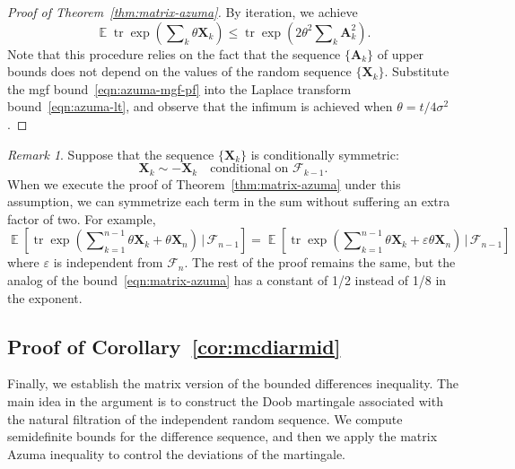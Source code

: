 \documentclass[11pt,letterpaper,twoside,reqno,draft]{amsart}
\theoremstyle{remark}
\newtheorem{rem}[thm]{Remark}
\numberwithin{equation}{section}
\numberwithin{thm}{section}
\begin{document}
\begin{proof}[Proof of Theorem~\ref{thm:matrix-azuma}]
By iteration, we achieve
\begin{equation} \label{eqn:azuma-mgf-pf}
{\operatorname{\mathbb{E}}} {\operatorname{tr}} \exp\left( \sum\nolimits_k \theta {\bm{{X}}}_k \right)
	\leq {\operatorname{tr}} \exp\left( 2\theta^2 \sum\nolimits_k {\bm{{A}}}_k^2 \right).
\end{equation}
Note that this procedure relies on the fact that the sequence $\{{\bm{{A}}}_k\}$ of upper bounds does not depend on the values of the random sequence $\{{\bm{{X}}}_k\}$.  Substitute the mgf bound~\eqref{eqn:azuma-mgf-pf} into the Laplace transform bound~\eqref{eqn:azuma-lt}, and observe that the infimum is achieved when $\theta = t/4\sigma^2$.
\end{proof}

\begin{rem} \label{rem:cond-sym}
Suppose that the sequence $\{{\bm{{X}}}_k\}$ is conditionally symmetric:
$$
{\bm{{X}}}_k \sim - {\bm{{X}}}_k
\quad\text{conditional on ${\mathscr{{F}}}_{k-1}$.}
$$
When we execute the proof of Theorem~\ref{thm:matrix-azuma} under this assumption, we can symmetrize each term in the sum without suffering an extra factor of two.  For example,
$$
{\operatorname{\mathbb{E}}}\left[ {\operatorname{tr}} \exp\left( \sum\nolimits_{k=1}^{n-1} \theta {\bm{{X}}}_k
	+ \theta {\bm{{X}}}_n \right) \, \big| \, {\mathscr{{F}}}_{n-1} \right]
	= {\operatorname{\mathbb{E}}}\left[ {\operatorname{tr}} \exp\left( \sum\nolimits_{k=1}^{n-1} \theta {\bm{{X}}}_k
	+ {\varepsilon} \theta {\bm{{X}}}_n \right) \, \big| \, {\mathscr{{F}}}_{n-1} \right]
$$
where ${\varepsilon}$ is independent from ${\mathscr{{F}}}_n$.  The rest of the proof remains the same, but the analog of the bound~\eqref{eqn:matrix-azuma} has a constant of 1/2 instead of 1/8 in the exponent. 
\end{rem}

\subsection{Proof of Corollary~\ref{cor:mcdiarmid}}

Finally, we establish the matrix version of the bounded differences inequality.  The main idea in the argument is to construct the Doob martingale associated with the natural filtration of the independent random sequence.  We compute semidefinite bounds for the difference sequence, and then we apply the matrix Azuma inequality to control the deviations of the martingale.
\end{document}
